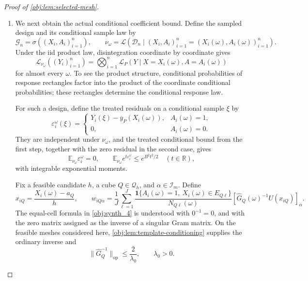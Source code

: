 \begin{proof}[Proof of \cref{obj:lem:selected-mesh}]
\begin{enumerate}
\item We next obtain the actual conditional coefficient bound. Define
the sampled design and its conditional sample law by
\[
\mathcal G_n=\sigma((X_i,A_i)_{i=1}^n),
\qquad
\nu_\omega
=
\mathcal L\!\left(\mathcal D_n\mid
(X_i,A_i)_{i=1}^n=(X_i(\omega),A_i(\omega))_{i=1}^n\right).
\]
Under the iid product law, disintegration coordinate by coordinate gives
\[
\mathcal L_{\nu_\omega}((Y_i)_{i=1}^n)
=
\bigotimes_{i=1}^n
\mathcal L_P(Y\mid X=X_i(\omega),A=A_i(\omega))
\]
for almost every \(\omega\). To see the product structure, conditional
probabilities of response rectangles factor into the product of the
coordinate conditional probabilities; these rectangles determine the
conditional response law.

For such a design, define the treated residuals on a conditional sample
\(\xi\) by
\[
\varepsilon_i^\omega(\xi)
=
\begin{cases}
Y_i(\xi)-\overline y_P(X_i(\omega)),&A_i(\omega)=1,\\
0,&A_i(\omega)=0.
\end{cases}
\]
They are independent under \(\nu_\omega\), and the treated conditional
bound from the first step, together with the zero residual in the second
case, gives
\[
\mathbb E_{\nu_\omega}\varepsilon_i^\omega=0,\qquad
\mathbb E_{\nu_\omega}e^{t\varepsilon_i^\omega}
\le e^{B^2t^2/2}\quad(t\in\mathbb R),
\]
with integrable exponential moments.

Fix a feasible candidate \(h\), a cube \(Q\in\mathcal Q_h\), and
\(\alpha\in\mathcal I_m\). Define
\[
x_{iQ}=\frac{X_i(\omega)-a_Q}{h},
\qquad
w_{iQ\alpha}
=
\frac1J\sum_{\ell=1}^{J}
\frac{\mathbf1\{A_i(\omega)=1,\ X_i(\omega)\in E_{Q\ell}\}}
     {N_{Q\ell}(\omega)}
[\widehat G_Q(\omega)^{-1}U(x_{iQ})]_\alpha.
\]
The equal-cell formula in \cref{obj:synth_4} is understood with
\(0^{-1}=0\), and with the zero matrix assigned as the inverse of a
singular Gram matrix. On the feasible meshes considered here,
\cref{obj:lem:template-conditioning} supplies the ordinary inverse and
\[
\|\widehat G_Q^{-1}\|_{\mathrm{op}}\le\frac2{\lambda_0},
\qquad \lambda_0>0.
\]


\end{enumerate}
\end{proof}

